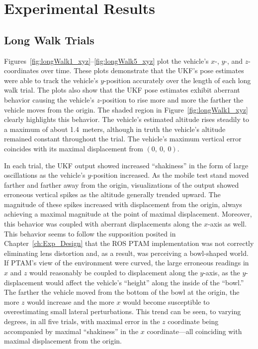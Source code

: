 \chapter{Experimental Results} \label{ch:Exp_Results}

\section{Long Walk Trials}

Figures~\ref{fig:longWalk1_xyz}--\ref{fig:longWalk5_xyz} plot the vehicle's $x$-, $y$-, and $z$-coordinates over time. These plots demonstrate that the UKF's pose estimates were able to track the vehicle's $y$-position accurately over the length of each long walk trial. The plots also show that the UKF pose estimates exhibit aberrant behavior causing the vehicle's $z$-position to rise more and more the farther the vehicle moves from the origin. The shaded region in Figure~\ref{fig:longWalk1_xyz} clearly highlights this behavior. The vehicle's estimated altitude rises steadily to a maximum of about 1.4~meters, although in truth the vehicle's altitude remained constant throughout the trial. The vehicle's maximum vertical error coincides with its maximal displacement from $\left( 0,\ 0,\ 0 \right)$.

In each trial, the UKF output showed increased ``shakiness'' in the form of large oscillations as the vehicle's $y$-position increased. As the mobile test stand moved farther and farther away from the origin, visualizations of the output showed erroneous vertical spikes as the altitude generally trended upward. The magnitude of these spikes increased with displacement from the origin, always achieving a maximal magnitude at the point of maximal displacement. Moreover, this behavior was coupled with aberrant displacements along the $x$-axis as well. This behavior seems to follow the supposition posited in Chapter~\ref{ch:Exp_Design} that the ROS PTAM implementation was not correctly eliminating lens distortion and, as a result, was perceiving a bowl-shaped world. If PTAM's view of the environment were curved, the large erroneous readings in $x$ and $z$ would reasonably be coupled to displacement along the $y$-axis, as the $y$-displacement would affect the vehicle's ``height'' along the inside of the ``bowl.'' The farther the vehicle moved from the bottom of the bowl at the origin, the more $z$ would increase and the more $x$ would become susceptible to overestimating small lateral perturbations. This trend can be seen, to varying degrees, in all five trials, with maximal error in the $z$ coordinate being accompanied by maximal ``shakiness'' in the $x$ coordinate---all coinciding with maximal displacement from the origin.


